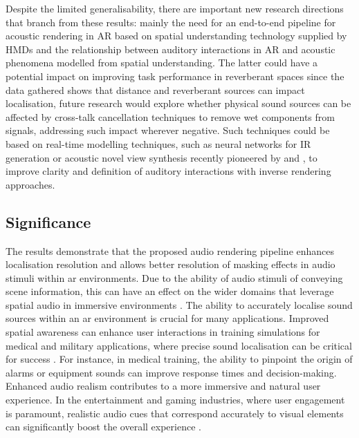Despite the limited generalisability, there are important new research directions that branch from these results: mainly the need for an end-to-end pipeline for acoustic rendering in AR based on spatial understanding technology supplied by HMDs and the relationship between auditory interactions in AR and acoustic phenomena modelled from spatial understanding. The latter could have a potential impact on improving task performance in reverberant spaces since the data gathered shows that distance and reverberant sources can impact localisation, future research would explore whether physical sound sources can be affected by cross-talk cancellation techniques to remove wet components from signals, addressing such impact wherever negative. Such techniques could be based on real-time modelling techniques, such as neural networks for IR generation or acoustic novel view synthesis recently pioneered by \cite{ratnarajah2022mesh2ir} and  \cite{chen2023novel}, to improve clarity and definition of auditory interactions with inverse rendering approaches. \par

\subsection{Significance}
The results demonstrate that the proposed audio rendering pipeline enhances localisation resolution and allows better resolution of masking effects in audio stimuli within \acrshort{ar} environments. Due to the ability of audio stimuli of conveying scene information, this can have an effect on the wider domains that leverage spatial audio in immersive environments \citep{yang2022audio}. 
The ability to accurately localise sound sources within an \acrshort{ar} environment is crucial for many applications. Improved spatial awareness can enhance user interactions in training simulations for medical and military applications, where precise sound localisation can be critical for success \citep{vine2023training}. For instance, in medical training, the ability to pinpoint the origin of alarms or equipment sounds can improve response times and decision-making. Enhanced audio realism contributes to a more immersive and natural user experience. In the entertainment and gaming industries, where user engagement is paramount, realistic audio cues that correspond accurately to visual elements can significantly boost the overall experience \citep{slater2009visual}.


